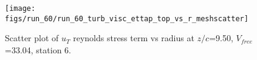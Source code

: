 \begin{figure}[H]
\centering
\texttt{[image: figs/run\_60/run\_60\_turb\_visc\_ettap\_top\_vs\_r\_meshscatter]}
\caption{Scatter plot of $
u_T$ reynolds stress term vs radius at $z/c$=9.50, $V_{free}$=33.04, station 6.}
\end{figure}


